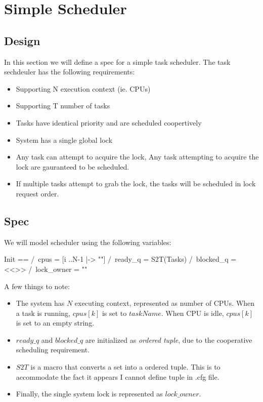 % 

\chapter{Simple Scheduler}

\section{Design}

In this section we will define a spec for a simple task scheduler. The task sechdeuler has the following
requirements:
\begin{itemize}
    \item Supporting N execution context (ie. CPUs)
    \item Supporting T number of tasks
    \item Tasks have identical priority and are scheduled coopertively
    \item System has a single global lock
    \item Any task can attempt to acquire the lock, Any task attempting to
    acquire the lock are gauranteed to be scheduled.
    \item If multiple tasks attempt to grab the lock, the tasks will be
    scheduled in lock request order. 
\end{itemize}

\section{Spec}

We will model scheduler using the following variables:\newline
\begin{tla}
Init ==
    /\ cpus = [i ..N-1 |-> ""] 
    /\ ready_q = S2T(Tasks)
    /\ blocked_q = <<>>
    /\ lock_owner = ""
\end{tla}
\begin{tlatex}
%
%
%
%
\end{tlatex}
\newline

A few things to note:
\begin{itemize}
    \item The system has $N$ executing context, represented as number of CPUs.
    When a task is running, $cpus[k]$ is set to $taskName$. When CPU is idle,
    $cpus[k]$ is set to an empty string. 
    \item $ready\_q$ and $blocked\_q$ are initialized as \textit{ordered tuple},
    due to the cooperative scheduling requirement.
    \item $S2T$ is a macro that converts a set into a ordered tuple. This is to
    accommodate the fact it appears I cannot define tuple in .cfg file.
    \item Finally, the single system lock is represented as $lock\_owner$. 
\end{itemize}

